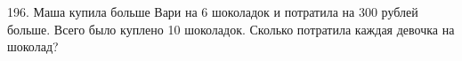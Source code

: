196. Маша купила больше Вари на 6 шоколадок и потратила на 300 рублей больше. Всего было куплено 10 шоколадок. Сколько потратила каждая девочка на шоколад?\\
